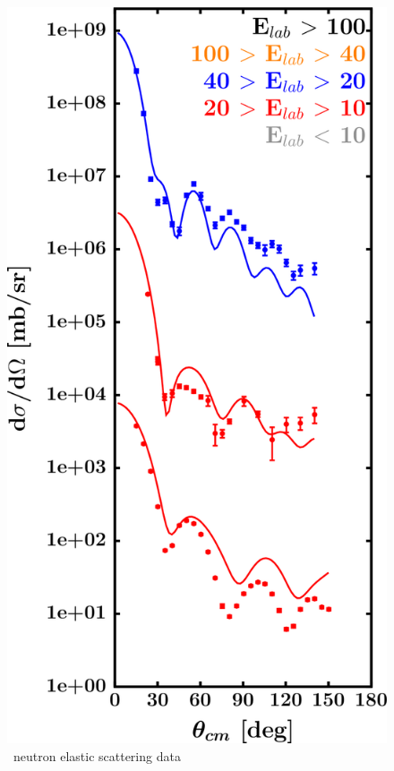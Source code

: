 \begin{figure}[H]
\begin{minipage}{0.45\textwidth}
        \includegraphics[width=1.0\textwidth]{figures/sn124_neutronElastic.png}
        \caption{\snFour\ neutron elastic scattering data}
        \label{DOMFitData_sn124_neutron_elastic}
    \end{minipage}
\end{figure}


